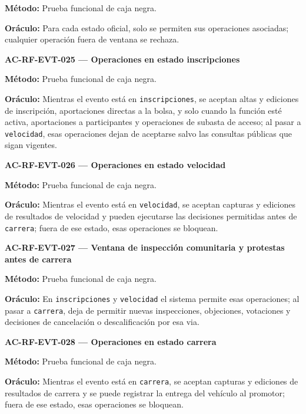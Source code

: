 \documentclass[10pt,letterpaper]{article}
\begin{document}
\textbf{Método:} Prueba funcional de caja negra.\par
\textbf{Oráculo:} Para cada estado oficial, solo se permiten sus operaciones asociadas; cualquier operación fuera de ventana se rechaza.\par\vspace{0.45em}
\noindent\textbf{AC-RF-EVT-025 --- Operaciones en estado inscripciones}\par
\textbf{Método:} Prueba funcional de caja negra.\par
\textbf{Oráculo:} Mientras el evento está en \texttt{inscripciones}, se aceptan altas y ediciones de inscripción, aportaciones directas a la bolsa, y solo cuando la función esté activa, aportaciones a participantes y operaciones de subasta de acceso; al pasar a \texttt{velocidad}, esas operaciones dejan de aceptarse salvo las consultas públicas que sigan vigentes.\par\vspace{0.45em}
\noindent\textbf{AC-RF-EVT-026 --- Operaciones en estado velocidad}\par
\textbf{Método:} Prueba funcional de caja negra.\par
\textbf{Oráculo:} Mientras el evento está en \texttt{velocidad}, se aceptan capturas y ediciones de resultados de velocidad y pueden ejecutarse las decisiones permitidas antes de \texttt{carrera}; fuera de ese estado, esas operaciones se bloquean.\par\vspace{0.45em}
\noindent\textbf{AC-RF-EVT-027 --- Ventana de inspección comunitaria y protestas antes de carrera}\par
\textbf{Método:} Prueba funcional de caja negra.\par
\textbf{Oráculo:} En \texttt{inscripciones} y \texttt{velocidad} el sistema permite esas operaciones; al pasar a \texttt{carrera}, deja de permitir nuevas inspecciones, objeciones, votaciones y decisiones de cancelación o descalificación por esa via.\par\vspace{0.45em}
\noindent\textbf{AC-RF-EVT-028 --- Operaciones en estado carrera}\par
\textbf{Método:} Prueba funcional de caja negra.\par
\textbf{Oráculo:} Mientras el evento está en \texttt{carrera}, se aceptan capturas y ediciones de resultados de carrera y se puede registrar la entrega del vehículo al promotor; fuera de ese estado, esas operaciones se bloquean.\par\vspace{0.45em}
\end{document}

